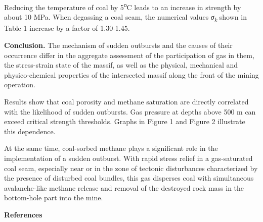 \begin{multicols}{2}
Reducing the temperature of coal by 5\textsuperscript{о}C leads to an
increase in strength by about 10 MPa. When degassing a coal seam, the
numerical values \emph{σ\textsubscript{k }}shown in Table 1 increase by
a factor of 1.30‑1.45.

{\bfseries Conclusion.} The mechanism of sudden outbursts and the causes of
their occurrence differ in the aggregate assessment of the participation
of gas in them, the stress-strain state of the massif, as well as the
physical, mechanical and physico-chemical properties of the intersected
massif along the front of the mining operation.

Results show that coal porosity and methane saturation are directly
correlated with the likelihood of sudden outbursts. Gas pressure at
depths above 500 m can exceed critical strength thresholds. Graphs in
Figure 1 and Figure 2 illustrate this dependence.

At the same time, coal-sorbed methane plays a significant role in the
implementation of a sudden outburst. With rapid stress relief in a
gas-saturated coal seam, especially near or in the zone of tectonic
disturbances characterized by the presence of disturbed coal bundles,
this gas disperses coal with simultaneous avalanche-like methane release
and removal of the destroyed rock mass in the bottom-hole part into the
mine.
\end{multicols}

\begin{center}
{\bfseries References}
\end{center}

